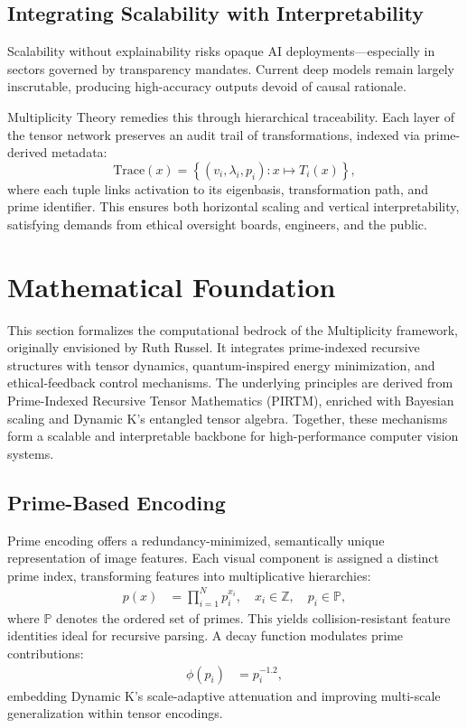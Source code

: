 \documentclass{article}
\theoremstyle{plain}
\begin{document}
\subsection{Integrating Scalability with Interpretability}
Scalability without explainability risks opaque AI deployments—especially in sectors governed by transparency mandates. Current deep models remain largely inscrutable, producing high-accuracy outputs devoid of causal rationale.

Multiplicity Theory remedies this through hierarchical traceability. Each layer of the tensor network preserves an audit trail of transformations, indexed via prime-derived metadata:
\[
\text{Trace}(x) = \left\{(v_i, \lambda_i, p_i): x \mapsto T_i(x) \right\},
\]
where each tuple links activation to its eigenbasis, transformation path, and prime identifier. This ensures both horizontal scaling and vertical interpretability, satisfying demands from ethical oversight boards, engineers, and the public.



\section{Mathematical Foundation}
This section formalizes the computational bedrock of the Multiplicity framework, originally envisioned by Ruth Russel. It integrates prime-indexed recursive structures with tensor dynamics, quantum-inspired energy minimization, and ethical-feedback control mechanisms. The underlying principles are derived from Prime-Indexed Recursive Tensor Mathematics (PIRTM), enriched with Bayesian scaling and Dynamic K's entangled tensor algebra. Together, these mechanisms form a scalable and interpretable backbone for high-performance computer vision systems.

\subsection{Prime-Based Encoding}
Prime encoding offers a redundancy-minimized, semantically unique representation of image features. Each visual component is assigned a distinct prime index, transforming features into multiplicative hierarchies:
\begin{align}
p(x) &= \prod_{i=1}^N p_i^{x_i}, \quad x_i \in \mathbb{Z}, \quad p_i \in \mathbb{P},
\end{align}
where \( \mathbb{P} \) denotes the ordered set of primes. This yields collision-resistant feature identities ideal for recursive parsing. A decay function modulates prime contributions:
\begin{align}
\phi(p_i) &= p_i^{-1.2},
\end{align}
embedding Dynamic K’s scale-adaptive attenuation and improving multi-scale generalization within tensor encodings.
\end{document}
